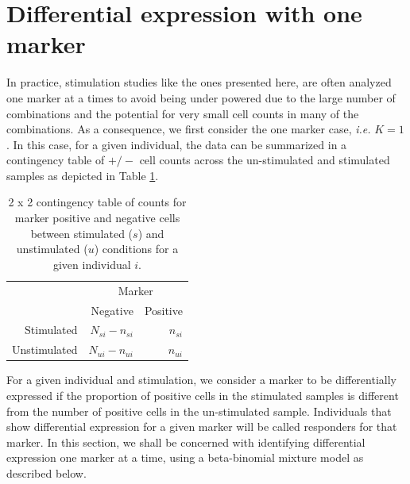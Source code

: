 \documentclass[11pt]{article}
\begin{document}
\section{Differential expression with one marker}
In practice, stimulation studies like the ones presented here, are often analyzed one marker at a times to avoid being under powered due to the large number of combinations and the potential for very small cell counts in many of the combinations. As a consequence, we first consider the one marker case, \textit{i.e.} $K=1$. In this case, for a given individual, the data can be summarized in a contingency table of $+/-$ cell counts across the un-stimulated and stimulated samples as depicted in Table \ref{tab:twobytwo}.

\begin{table}[ht]
\centering
\parbox{0.8\linewidth}{
\caption{2 x 2 contingency table of counts for marker positive and negative cells between stimulated ($s$) and unstimulated ($u$) conditions for a given individual $i$.}\label{tab:twobytwo}
\centering
\begin{tabular}{rrr}

  \hline
\multicolumn{1}{l}{}&
\multicolumn{2}{c}{Marker}\\
 & Negative & Positive \\ 
  \hline
Stimulated &   $N_{si} - n_{si}$ &   $n_{si}$ \\ 
Unstimulated &   $N_{ui}-n_{ui}$ &   $n_{ui}$ \\ 
   \hline
\end{tabular}
}
\end{table}
For a given individual and stimulation, we consider a marker to be differentially expressed if the proportion of positive cells in the stimulated samples is different from the number of positive cells in the un-stimulated sample. Individuals that show differential expression for a given marker will be called responders for that marker. In this section, we shall be concerned with identifying differential expression one marker at a time, using a beta-binomial mixture model as described below. 
\end{document}
